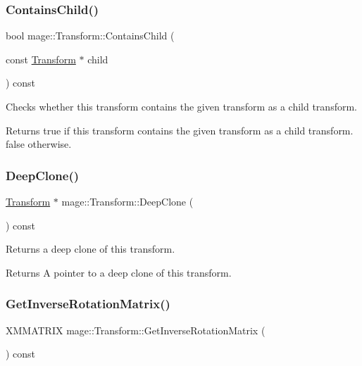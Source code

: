 \subsubsection{\texorpdfstring{Contains\+Child()}{ContainsChild()}}
{\footnotesize\ttfamily bool mage\+::\+Transform\+::\+Contains\+Child (\begin{DoxyParamCaption}\item[{const \hyperlink{structmage_1_1_transform}{Transform} $\ast$}]{child }\end{DoxyParamCaption}) const}

Checks whether this transform contains the given transform as a child transform.

\begin{DoxyReturn}{Returns}
{\ttfamily true} if this transform contains the given transform as a child transform. {\ttfamily false} otherwise. 
\end{DoxyReturn}
\hypertarget{structmage_1_1_transform_a20190fe94be3467fee3032a2d912247d}{}\label{structmage_1_1_transform_a20190fe94be3467fee3032a2d912247d} 
\subsubsection{\texorpdfstring{Deep\+Clone()}{DeepClone()}}
{\footnotesize\ttfamily \hyperlink{structmage_1_1_transform}{Transform} $\ast$ mage\+::\+Transform\+::\+Deep\+Clone (\begin{DoxyParamCaption}{ }\end{DoxyParamCaption}) const}

Returns a deep clone of this transform.

\begin{DoxyReturn}{Returns}
A pointer to a deep clone of this transform. 
\end{DoxyReturn}
\hypertarget{structmage_1_1_transform_a12e7ee212a9270fb3f01de9b7f5ee3b8}{}\label{structmage_1_1_transform_a12e7ee212a9270fb3f01de9b7f5ee3b8} 
\subsubsection{\texorpdfstring{Get\+Inverse\+Rotation\+Matrix()}{GetInverseRotationMatrix()}}
{\footnotesize\ttfamily X\+M\+M\+A\+T\+R\+IX mage\+::\+Transform\+::\+Get\+Inverse\+Rotation\+Matrix (\begin{DoxyParamCaption}{ }\end{DoxyParamCaption}) const\hspace{0.3cm}{\ttfamily [private]}}

